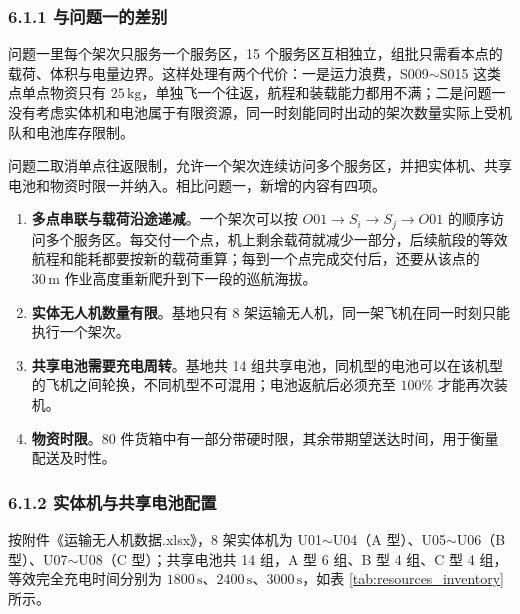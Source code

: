 \documentclass[withoutpreface,bwprint]{format}
\begin{document}
\subsubsection{6.1.1 与问题一的差别}
问题一里每个架次只服务一个服务区，15 个服务区互相独立，组批只需看本点的载荷、体积与电量边界。这样处理有两个代价：一是运力浪费，S009$\sim$S015 这类点单点物资只有 $25\,\text{kg}$，单独飞一个往返，航程和装载能力都用不满；二是问题一没有考虑实体机和电池属于有限资源，同一时刻能同时出动的架次数量实际上受机队和电池库存限制\cite{poikonen2017, schermer2019}。

问题二取消单点往返限制，允许一个架次连续访问多个服务区，并把实体机、共享电池和物资时限一并纳入。相比问题一，新增的内容有四项。

\begin{enumerate}[leftmargin=*]
    \item \textbf{多点串联与载荷沿途递减}。一个架次可以按 $O01 \to S_i \to S_j \to O01$ 的顺序访问多个服务区。每交付一个点，机上剩余载荷就减少一部分，后续航段的等效航程和能耗都要按新的载荷重算；每到一个点完成交付后，还要从该点的 $30\,\text{m}$ 作业高度重新爬升到下一段的巡航海拔。
    \item \textbf{实体无人机数量有限}。基地只有 8 架运输无人机，同一架飞机在同一时刻只能执行一个架次。
    \item \textbf{共享电池需要充电周转}。基地共 14 组共享电池，同机型的电池可以在该机型的飞机之间轮换，不同机型不可混用；电池返航后必须充至 $100\%$ 才能再次装机。
    \item \textbf{物资时限}。80 件货箱中有一部分带硬时限，其余带期望送达时间，用于衡量配送及时性。
\end{enumerate}

\subsubsection{6.1.2 实体机与共享电池配置}
按附件《运输无人机数据.xlsx》，8 架实体机为 U01$\sim$U04（A 型）、U05$\sim$U06（B 型）、U07$\sim$U08（C 型）；共享电池共 14 组，A 型 6 组、B 型 4 组、C 型 4 组，等效完全充电时间分别为 $1800\,\text{s}$、$2400\,\text{s}$、$3000\,\text{s}$，如表 \ref{tab:resources_inventory} 所示。
\end{document}
